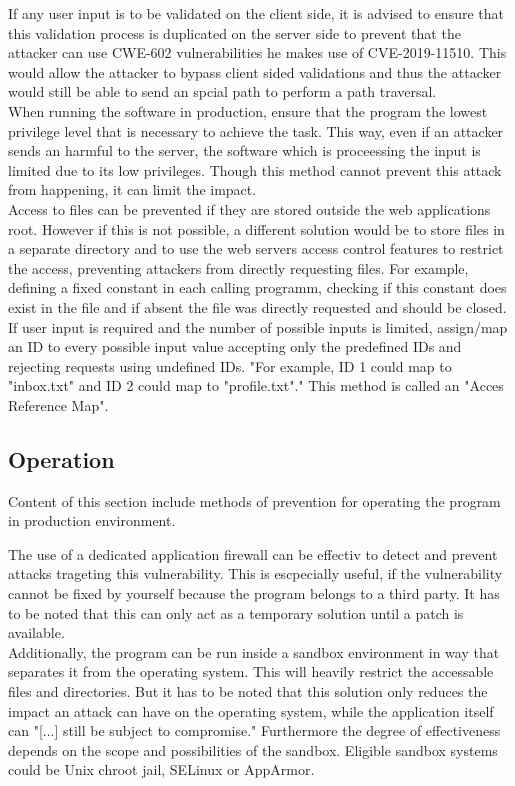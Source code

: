 If any user input is to be validated on the client side, it is advised to ensure that this validation process is duplicated on the server side to prevent that the attacker can use CWE-602 vulnerabilities he makes use of CVE-2019-11510. This would allow the attacker to bypass client sided validations and thus the attacker would still be able to send an spcial path to perform a path traversal. \autocite{CWE22-Definition:online}\\
When running the software in production, ensure that the program the lowest privilege level that is necessary to achieve the task. This way, even if an attacker sends an harmful to the server, the software which is proceessing the input is limited due to its low privileges. Though this method cannot prevent this attack from happening, it can limit the impact.\autocite{CWE22-Definition:online}\\
Access to files can be prevented if they are stored outside the web applications root. However if this is not possible, a different solution would be to store files in a separate directory and to use the web servers access control features to restrict the access, preventing attackers from directly requesting files. For example, defining a fixed constant in each calling programm, checking if this constant does exist in the file and if absent the file was directly requested and should be closed. \autocite{CWE22-Definition:online}\\
If user input is required and the number of possible inputs is limited, assign/map an ID to every possible input value accepting only the predefined IDs and rejecting requests using undefined IDs. \autocite{CWE22-Definition:online} "For example, ID 1 could map to "inbox.txt" and ID 2 could map to "profile.txt"." \autocite{CWE22-Definition:online} This method is called an "Acces Reference Map".

\subsection{Operation}
\label{operation}
Content of this section include methods of prevention for operating the program in production environment.

The use of a dedicated application firewall can be effectiv to detect and prevent attacks trageting this vulnerability. This is escpecially useful, if the vulnerability cannot be fixed by yourself because the program belongs to a third party. \autocite{CWE22-Definition:online} It has to be noted that this can only act as a temporary solution until a patch is available.\\
Additionally, the program can be run inside a sandbox environment in way that separates it from the operating system. This will heavily restrict the accessable files and directories. But it has to be noted that this solution only reduces the impact an attack can have on the operating system, while the application itself can "[...] still be subject to compromise." \autocite{CWE22-Definition:online} Furthermore the degree of effectiveness depends on the scope and possibilities of the sandbox. Eligible sandbox systems could be Unix chroot jail, SELinux or AppArmor. \autocite{CWE22-Definition:online}

